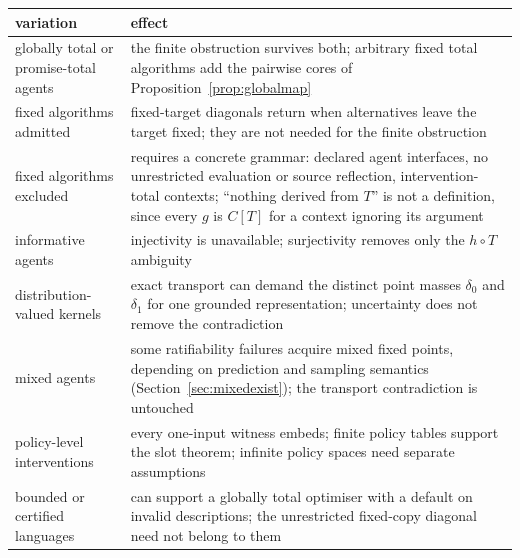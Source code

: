 \begin{center}
\small
\renewcommand{\arraystretch}{1.2}
\begin{tabularx}{\textwidth}{@{}>{\raggedright\arraybackslash}p{10em}>{\raggedright\arraybackslash}X@{}}
  \toprule
  variation & effect \\
  \midrule
  globally total or promise-total agents & the finite obstruction survives both; arbitrary fixed total
     algorithms add the pairwise cores of Proposition~\ref{prop:globalmap} \\
  fixed algorithms admitted & fixed-target diagonals return when alternatives leave the target fixed;
     they are not needed for the finite obstruction \\
  fixed algorithms excluded & requires a concrete grammar: declared agent interfaces, no unrestricted
     evaluation or source reflection, intervention-total contexts; \enquote{nothing derived from $T$}
     is not a definition, since every $g$ is $C[T]$ for a context ignoring its argument \\
  informative agents & injectivity is unavailable; surjectivity removes only the $h\circ T$ ambiguity \\
  distribution-valued kernels & exact transport can demand the distinct point masses $\delta_0$ and
     $\delta_1$ for one grounded representation; uncertainty does not remove the contradiction \\
  mixed agents & some ratifiability failures acquire mixed fixed points, depending on prediction and
     sampling semantics (Section~\ref{sec:mixedexist}); the transport contradiction is untouched \\
  policy-level interventions & every one-input witness embeds; finite policy tables support the slot
     theorem; infinite policy spaces need separate assumptions \\
  bounded or certified languages & can support a globally total optimiser with a default on invalid
     descriptions; the unrestricted fixed-copy diagonal need not belong to them \\
  \bottomrule
\end{tabularx}
\end{center}
